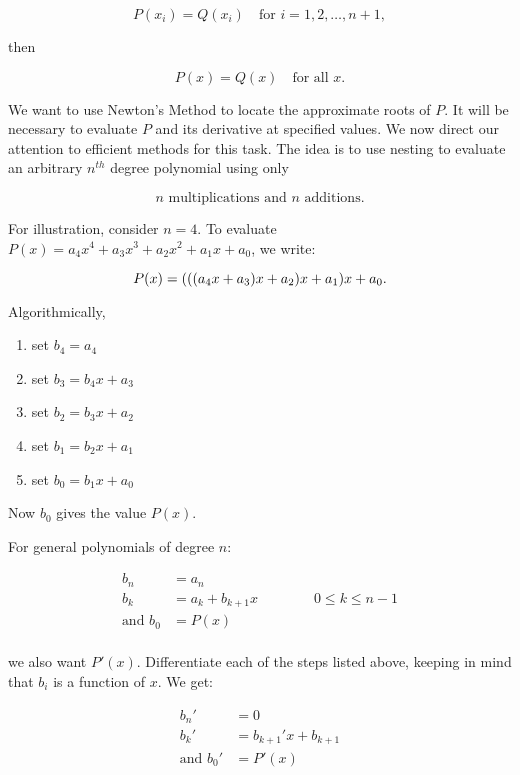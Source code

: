 \[
  P(x_i) = Q(x_i) \quad \text{for } i = 1,2, \dots, n+1,
\]

then 

\[
  P(x) = Q(x) \quad \text{for all } x.
\]

We want to use Newton's Method to locate the approximate roots of $P$. It will
be necessary to evaluate $P$ and its derivative at specified values. We now 
direct our attention to efficient methods for this task. The idea is to use 
nesting to evaluate an arbitrary $n^{th}$ degree polynomial using only

\[
  n \text{ multiplications and } n \text{ additions}
.\]

For illustration, consider $n=4$. To evaluate 
$P(x) = a_4x^4 + a_3x^3 + a_2x^2 + a_1x+a_0$, we write:

\[
    P(x) = \pqty{
      \pqty{
        \pqty{
          a_4x + a_3
        } x + a_2
      } x + a_1
    } x + a_0
.\]

Algorithmically,

\begin{enumerate}
  \item set $b_4 = a_4$
  \item set $b_3 = b_4x + a_3$
  \item set $b_2 = b_3x + a_2$
  \item set $b_1 = b_2x + a_1$
  \item set $b_0 = b_1x + a_0$
\end{enumerate}

Now $b_0$ gives the value $P(x)$.

For general polynomials of degree $n:$

\begin{align*}
  b_n &= a_n \\
  b_k &= a_k+b_{k+1}x \qquad\qquad 0 \leq k \leq n-1 \\
  \text{and } b_0 &= P(x) \\
\end{align*}

we also want $P'(x)$. Differentiate each of the steps listed above, keeping in
mind that $b_i$ is a function of $x$. We get:

\begin{align*}
  b_n ' &= 0 \\
  b_k' &= b_{k+1}'x + b_{k+1} \\
  \text{and } b_0' &= P'(x) \\
\end{align*}

